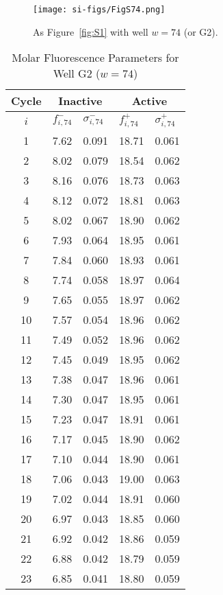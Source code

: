                 \begin{figure}
                    \centering
                    \texttt{[image: si-figs/FigS74.png]}
                    \caption{
                        As Figure~\ref{fig:S1} with well $w=74$ (or G2).
                    }
                \end{figure}
                \clearpage
    \begin{table}
        \caption{Molar Fluorescence Parameters for Well G2 ($w=74$)}
        \centering
        \begin{tabular}{c|ll|ll}
            Cycle & \multicolumn{2}{c|}{Inactive} & \multicolumn{2}{c}{Active} \\
            \hline
            $i$ & $f_{i,74}^{-}$ & $\sigma_{i,74}^{-}$ &  $f_{i,74}^{+}$ & $\sigma_{i,74}^{+}$ \\
            \hline
    1 & 7.62 & 0.091 & 18.71 & 0.061 \\
2 & 8.02 & 0.079 & 18.54 & 0.062 \\
3 & 8.16 & 0.076 & 18.73 & 0.063 \\
4 & 8.12 & 0.072 & 18.81 & 0.063 \\
5 & 8.02 & 0.067 & 18.90 & 0.062 \\
6 & 7.93 & 0.064 & 18.95 & 0.061 \\
7 & 7.84 & 0.060 & 18.93 & 0.061 \\
8 & 7.74 & 0.058 & 18.97 & 0.064 \\
9 & 7.65 & 0.055 & 18.97 & 0.062 \\
10 & 7.57 & 0.054 & 18.96 & 0.062 \\
11 & 7.49 & 0.052 & 18.96 & 0.062 \\
12 & 7.45 & 0.049 & 18.95 & 0.062 \\
13 & 7.38 & 0.047 & 18.96 & 0.061 \\
14 & 7.30 & 0.047 & 18.95 & 0.061 \\
15 & 7.23 & 0.047 & 18.91 & 0.061 \\
16 & 7.17 & 0.045 & 18.90 & 0.062 \\
17 & 7.10 & 0.044 & 18.90 & 0.061 \\
18 & 7.06 & 0.043 & 19.00 & 0.063 \\
19 & 7.02 & 0.044 & 18.91 & 0.060 \\
20 & 6.97 & 0.043 & 18.85 & 0.060 \\
21 & 6.92 & 0.042 & 18.86 & 0.059 \\
22 & 6.88 & 0.042 & 18.79 & 0.059 \\
23 & 6.85 & 0.041 & 18.80 & 0.059 \\

\end{tabular}
\end{table}

